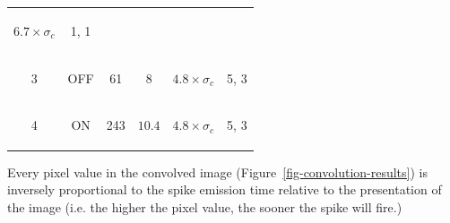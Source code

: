 \documentclass{frontiersENG} %
\newenvironment{mycell}[1]
{
	\begin{minipage}{#1}
		\begin{center}
			\vspace*{0.15cm}
		}
		{
			\vspace*{0.1cm}
		\end{center}
	\end{minipage}
}
\begin{document}
\begin{table}[htb]
\begin{center}
\begin{tabular}{c c c c c c}
      \begin{mycell}{1.6cm}$6.7 \times \sigma_c$ \end{mycell}& 
      \begin{mycell}{1.6cm}1, 1 \end{mycell}\\
			\begin{mycell}{0.8cm} 3 \end{mycell} &
			\begin{mycell}{1.1cm} \textsc{OFF}\end{mycell} & 
			\begin{mycell}{1.1cm} 61 \end{mycell}& 
			\begin{mycell}{1.6cm}$8$ \end{mycell}& 
      \begin{mycell}{1.6cm}$4.8 \times \sigma_c$ \end{mycell}& 
      \begin{mycell}{1.6cm}5, 3\end{mycell} \\
			\begin{mycell}{0.8cm} 4  \end{mycell} & 
			\begin{mycell}{1.1cm} \textsc{ON} \end{mycell} & 
			\begin{mycell}{1.1cm} 243 \end{mycell} &
			\begin{mycell}{1.6cm}$10.4$\end{mycell} & 
      \begin{mycell}{1.6cm}$4.8 \times \sigma_c$\end{mycell} & 
      \begin{mycell}{1.6cm}5, 3 \end{mycell}
		\end{tabular}
	\end{center}
	\label{tab-kernel-specs}
\end{table}

Every pixel value in the convolved image (Figure~\ref{fig-convolution-results}) 
is inversely proportional to the spike emission time relative to the presentation of the image (i.e. the higher the pixel value, the sooner the spike will fire.)
\end{document}
